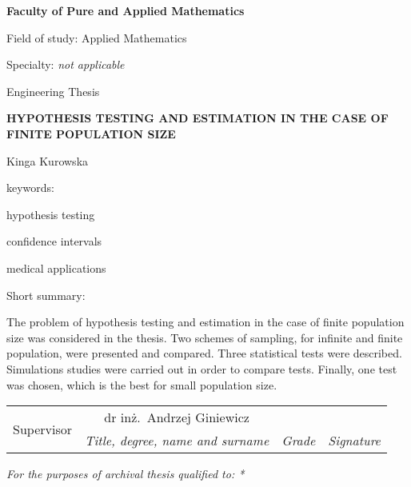 \documentclass[12pt,a4paper,twoside]{book}
\begin{document}
\begin{titlepage}
\noindent\textbf{\large Faculty of Pure and Applied Mathematics}
\par\medskip\noindent
Field of study: Applied Mathematics
\par\noindent
Specialty: \textit{not applicable}
\vspace*{36pt}
\begin{center}
\LARGE Engineering Thesis
\end{center}
\vspace*{24pt}
\begin{center}
\uppercase{\Large\bfseries%
Hypothesis Testing and Estimation in the Case of Finite Population Size}
\end{center}
\vspace*{12pt}
\begin{center}
Kinga Kurowska
\end{center}
\vspace*{12pt}
\begin{flushright}
keywords:\par\noindent
hypothesis testing\par\noindent
confidence intervals\par\noindent
medical applications \par\noindent
\end{flushright}
\begin{flushleft}
Short summary:\par
The problem of hypothesis testing and estimation in the case of finite population size was considered in the thesis. Two schemes of sampling, for infinite and finite population, were presented and compared. Three statistical tests were described. Simulations studies were carried out in order to compare tests. Finally, one test was chosen, which is the best for small population size.
\smallskip
\end{flushleft}
\begin{tabularx}{\textwidth}{|l|c|X|X|}
	\hline
	\multirow{2}{*}{\footnotesize Supervisor} & {\small dr inż.\ Andrzej Giniewicz} &  &  \\
	\cline{2-4}
	& \textit{\footnotesize Title, degree, name and surname} & \textit{\footnotesize Grade} & \textit{\footnotesize Signature} \\
	\hline
\end{tabularx}
\smallskip
\begin{flushleft}
\small\itshape
For the purposes of archival thesis qualified to: *

\end{flushleft}
\end{titlepage}
\end{document}
